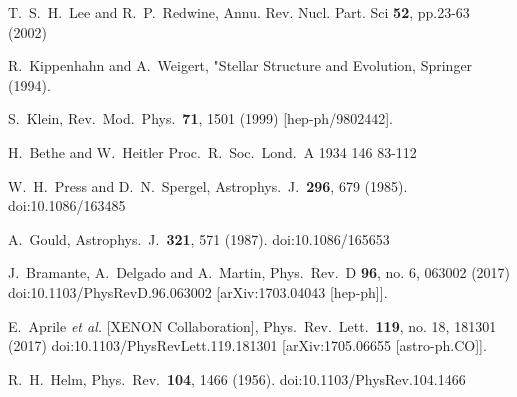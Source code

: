 T.~S.~H.~Lee and R.~P.~Redwine,
 Annu. Rev. Nucl. Part. Sci {\bf 52}, pp.23-63 (2002)

R.~Kippenhahn and A.~Weigert, "Stellar Structure and Evolution, Springer (1994).

  S.~Klein,
  Rev.\ Mod.\ Phys.\  {\bf 71}, 1501 (1999)
  [hep-ph/9802442].

  H.~Bethe and W.~Heitler
  Proc.\ R.\ Soc.\ Lond.\ A 1934 146 83-112

  W.~H.~Press and D.~N.~Spergel,
  Astrophys.\ J.\  {\bf 296}, 679 (1985).
  doi:10.1086/163485

  A.~Gould,
  Astrophys.\ J.\  {\bf 321}, 571 (1987).
  doi:10.1086/165653

  J.~Bramante, A.~Delgado and A.~Martin,
  Phys.\ Rev.\ D {\bf 96}, no. 6, 063002 (2017)
  doi:10.1103/PhysRevD.96.063002
  [arXiv:1703.04043 [hep-ph]].

  E.~Aprile {\it et al.} [XENON Collaboration],
  Phys.\ Rev.\ Lett.\  {\bf 119}, no. 18, 181301 (2017)
  doi:10.1103/PhysRevLett.119.181301
  [arXiv:1705.06655 [astro-ph.CO]].

  R.~H.~Helm,
  Phys.\ Rev.\  {\bf 104}, 1466 (1956).
  doi:10.1103/PhysRev.104.1466

